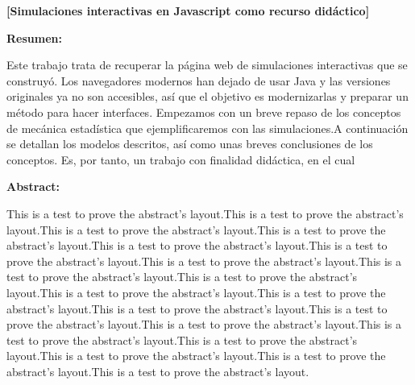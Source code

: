 \documentclass[11pt, a4paper]{article} %
\theoremstyle{named}
\begin{document}
{\bfseries \large [Simulaciones interactivas en Javascript como recurso didáctico] }\vspace{10mm}

{\bfseries \large Resumen:} \vspace{5mm}

Este trabajo trata de recuperar la página web de simulaciones interactivas que se construyó. Los navegadores modernos han dejado de usar Java y las versiones originales ya no son accesibles, así que el objetivo es modernizarlas y preparar un método para hacer interfaces.
Empezamos con un breve repaso de los conceptos de mecánica estadística que ejemplificaremos con las simulaciones.A continuación se detallan los modelos descritos, así como unas breves conclusiones de los conceptos.
Es, por tanto, un trabajo con finalidad didáctica, en el cual

\vspace{1cm}

{\bfseries \large Abstract: }\vspace{5mm}

This is a test to prove the abstract's layout.This is a test to prove the abstract's layout.This is a test to prove the abstract's layout.This is a test to prove the abstract's layout.This is a test to prove the abstract's layout.This is a test to prove the abstract's layout.This is a test to prove the abstract's layout.This is a test to prove the abstract's layout.This is a test to prove the abstract's layout.This is a test to prove the abstract's layout.This is a test to prove the abstract's layout.This is a test to prove the abstract's layout.This is a test to prove the abstract's layout.This is a test to prove the abstract's layout.This is a test to prove the abstract's layout.This is a test to prove the abstract's layout.This is a test to prove the abstract's layout.This is a test to prove the abstract's layout.This is a test to prove the abstract's layout.
\vspace{1cm}


\newpage

\tableofcontents
\end{document}
